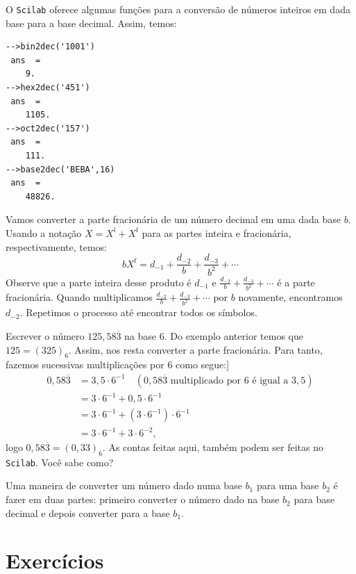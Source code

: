 \documentclass[main.tex]{subfiles}
\begin{document}
\ifisscilab
\begin{ex}[Scilab]
  O \verb+Scilab+ oferece algumas funções para a conversão de números inteiros em dada base para a base decimal. Assim, temos:
\begin{verbatim}
-->bin2dec('1001')
 ans  =
    9.  
-->hex2dec('451')
 ans  =
    1105.  
-->oct2dec('157')
 ans  =
    111.
-->base2dec('BEBA',16)
 ans  =
    48826.  
\end{verbatim}
\end{ex}
\fi

Vamos converter a parte fracionária de um número decimal em uma dada base $b$. Usando a notação $X = X^{\mbox{i}} + X^{\mbox{f}}$ para as partes inteira e fracionária, respectivamente, temos:
\begin{equation*}
  bX^{\mbox{f}}=d_{-1}+\frac{d_{-2}}{b}+\frac{d_{-3}}{b^2}+\cdots  
\end{equation*}
Observe que a parte inteira desse produto é $d_{-1}$ e $\frac{d_{-2}}{b}+\frac{d_{-3}}{b^2}+\cdots$ é a parte fracionária. Quando multiplicamos $\frac{d_{-2}}{b}+\frac{d_{-3}}{b^2}+\cdots$ por $b$ novamente, encontramos $d_{-2}$. Repetimos o processo até encontrar todos os símbolos.

\begin{ex} Escrever o número $125,58\overline{3}$ na base $6$. Do exemplo anterior temos que $125=(325)_6$. Assim, nos resta converter a parte fracionária. Para tanto, fazemos sucessivas multiplicações por $6$ como segue:]
  \begin{align*}
    0,58\overline{3} &= 3,5\cdot 6^{-1}\quad(\mbox{$0,58\overline{3}$ multiplicado por $6$ é igual a $3,5$})\\
    &= 3\cdot 6^{-1} + 0,5\cdot 6^{-1}\\
    &= 3\cdot 6^{-1} + (3\cdot 6^{-1})\cdot 6^{-1}\\
    &= 3\cdot 6^{-1} + 3\cdot 6^{-2},
  \end{align*}
logo $0,58\overline{3} = (0,33)_6$.
\ifisscilab
As contas feitas aqui, também podem ser feitas no \verb+Scilab+. Você sabe como?
\fi
\end{ex}

Uma maneira de converter um número dado numa base $b_1$ para uma base $b_2$ é fazer em duas partes: primeiro converter o número dado na base $b_2$ para base decimal e depois converter para a base $b_1$.

\section*{Exercícios}
\end{document}
